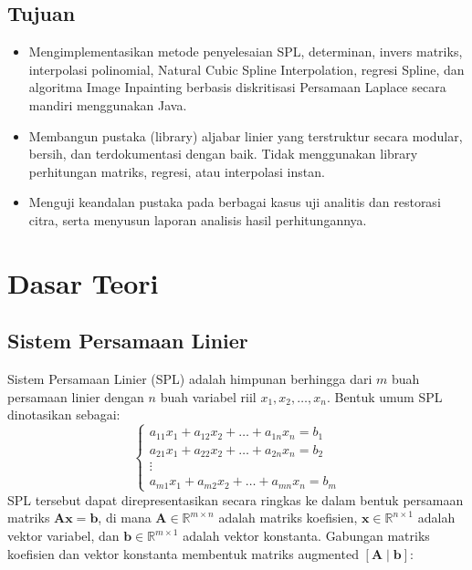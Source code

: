 \documentclass[12pt]{article}
\begin{document}
\subsection{Tujuan}
\begin{itemize}
    \item Mengimplementasikan metode penyelesaian SPL, determinan, invers matriks,           interpolasi polinomial, Natural Cubic Spline Interpolation, regresi Spline,        dan algoritma Image Inpainting berbasis diskritisasi Persamaan Laplace             secara mandiri menggunakan Java.
    \item Membangun pustaka (library) aljabar linier yang terstruktur secara modular,        bersih, dan terdokumentasi dengan baik. Tidak menggunakan library                  perhitungan matriks, regresi, atau interpolasi instan.
    \item Menguji keandalan pustaka pada berbagai kasus uji analitis dan restorasi           citra, serta menyusun laporan analisis hasil perhitungannya.
\end{itemize}

\section{Dasar Teori}

\subsection{Sistem Persamaan Linier}
Sistem Persamaan Linier (SPL) adalah himpunan berhingga dari $m$ buah persamaan linier dengan $n$ buah variabel riil $x_1, x_2, \dots, x_n$. Bentuk umum SPL dinotasikan sebagai:
\begin{equation}
    \begin{cases}
        a_{11}x_1 + a_{12}x_2 + \dots + a_{1n}x_n = b_1 \\
        a_{21}x_1 + a_{22}x_2 + \dots + a_{2n}x_n = b_2 \\
        \vdots \\
        a_{m1}x_1 + a_{m2}x_2 + \dots + a_{mn}x_n = b_m
    \end{cases}
\end{equation}
SPL tersebut dapat direpresentasikan secara ringkas ke dalam bentuk persamaan matriks 
$\mathbf{A}\mathbf{x} = \mathbf{b}$, di mana $\mathbf{A} \in \mathbb{R}^{m \times n}$ adalah matriks koefisien, $\mathbf{x} \in \mathbb{R}^{n \times 1}$ adalah vektor variabel, dan $\mathbf{b} \in \mathbb{R}^{m \times 1}$ adalah vektor konstanta. Gabungan matriks koefisien dan vektor konstanta membentuk matriks augmented $[\mathbf{A} \mid \mathbf{b}]$:
\end{document}
